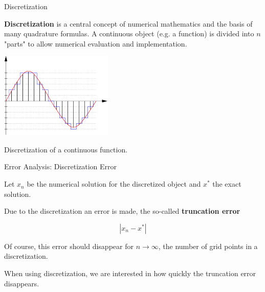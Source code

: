 \documentclass[11pt,compress,t,notes=noshow, xcolor=table]{beamer}
\begin{document}
\begin{vbframe}{Discretization}

\textbf{Discretization} is a central concept of numerical mathematics and the basis of many quadrature formulas. A continuous object (e.g. a function) is divided into $n$ "parts" to allow numerical evaluation and implementation.

\vspace*{0.2cm}

%

\begin{center}
\includegraphics[width=0.4\textwidth]{figure_man/diskretisierung.png}\\
\begin{footnotesize}
Discretization of a continuous function.
\end{footnotesize}
\end{center}

\end{vbframe}

\begin{vbframe}{Error Analysis: Discretization Error}

Let $x_n$ be the numerical solution for the discretized object and $x^*$ the exact solution.

\lz

Due to the discretization an error is made, the so-called \textbf{truncation error}

$$
|x_n - x^*|
$$

Of course, this error should disappear for $n \to \infty$, the number of grid points in a discretization.

\lz

When using discretization, we are interested in how quickly the truncation error disappears.

\end{vbframe}
\end{document}
